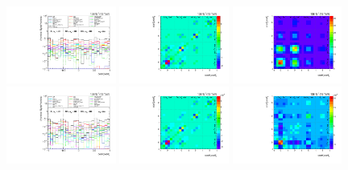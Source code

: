\begin{refsection}
\begin{figure}[htb]
\begin{center}
 \includegraphics[width=0.32\textwidth]{fig_fullRun2UL/unfolding/combined/deltaSystCombinedlog_rebinnedB_c_rr_mttbar.pdf}
 \includegraphics[width=0.32\textwidth]{fig_fullRun2UL/unfolding/combined/StatCovMatrix_rebinnedB_c_rr_mttbar.pdf}
 \includegraphics[width=0.32\textwidth]{fig_fullRun2UL/unfolding/combined/TotalSystCovMatrix_rebinnedB_c_rr_mttbar.pdf} \\
 \includegraphics[width=0.32\textwidth]{fig_fullRun2UL/unfolding/combined/deltaSystCombinedlogNorm_rebinnedB_c_rr_mttbar.pdf}
 \includegraphics[width=0.32\textwidth]{fig_fullRun2UL/unfolding/combined/StatCovMatrixNorm_rebinnedB_c_rr_mttbar.pdf}
 \includegraphics[width=0.32\textwidth]{fig_fullRun2UL/unfolding/combined/TotalSystCovMatrixNorm_rebinnedB_c_rr_mttbar.pdf} \\

\end{center}
\end{figure}
\end{refsection}
